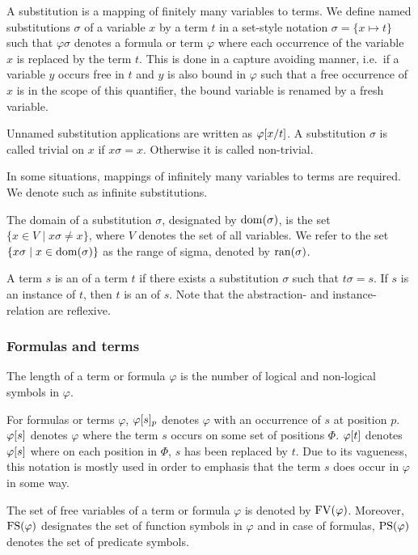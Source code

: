 A substitution is a mapping of finitely many variables to terms.
We define named substitutions $\sigma$ of a variable $x$ by a term $t$ in a set-style notation $\sigma = \{ x \mapsto t\}$ such that 
$\varphi\sigma$ denotes a formula or term $\varphi$ where each occurrence of the variable $x$ is replaced by the term $t$.
This is done in a capture avoiding manner, i.e.\ if a variable $y$ occurs free in $t$ and $y$ is also bound in $\varphi$ such that a free occurrence of $x$ is in the scope of this quantifier, the bound variable is renamed by a fresh variable.

Unnamed substitution applications are written as $\varphi[x/t]$.
A substitution $\sigma$ is called trivial on $x$ if $x\sigma = x$. Otherwise it is called non-trivial.

In some situations, mappings of infinitely many variables to terms are required. We denote such as infinite substitutions.

The domain of a substitution $\sigma$, designated by $\operatorname{dom}(\sigma)$, is the set $\{x \in V \mid x\sigma \neq x\}$, where $V$ denotes the set of all variables.
We refer to the set $\{x\sigma \mid x\in \operatorname{dom}(\sigma)\}$ as the range of sigma, denoted by $\operatorname{ran}(\sigma)$.



A term $s$ is an  of a term $t$ if there exists a substitution $\sigma$ such that $t\sigma = s$.
If $s$ is an instance of $t$, then $t$ is an  of $s$. Note that the abstraction- and instance-relation are reflexive. 

\subsubsection*{Formulas and terms}
The length of a term or formula $\varphi$ is the number of logical and non-logical symbols in $\varphi$.

For formulas or terms $\varphi$, $\varphi{\ensuremath{[s]}_{p}}$ denotes $\varphi$ with an occurrence of $s$ at position $p$.
$\varphi[s]$ denotes $\varphi$ where the term $s$ occurs on some set of positions $\Phi$. $\varphi[t]$ denotes $\varphi[s]$ where on each position in $\Phi$, $s$ has been replaced by $t$. Due to its vagueness, this notation is mostly used in order to emphasis that the term $s$ does occur in $\varphi$ in some way.

The set of free variables of a term or formula $\varphi$ is denoted by $\operatorname{FV}(\varphi)$.
Moreover,
$\operatorname{FS}(\varphi)$ designates the set of function symbols in $\varphi$ and in case of formulas, $\operatorname{PS}(\varphi)$ denotes the set of predicate symbols.


